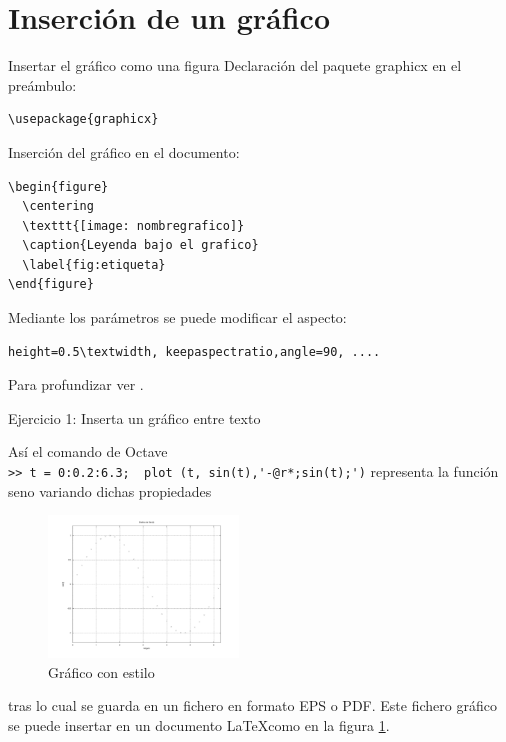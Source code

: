 \documentclass{beamer}
\begin{document}
\section{Inserci\'on de un gr\'afico}
\begin{frame}[fragile]{Insertar el gr\'afico como una figura}
Declaraci\'on del paquete graphicx en el pre\'ambulo:
\begin{verbatim}\usepackage{graphicx} \end{verbatim}

Inserci\'on del gr\'afico en el documento:
\begin{verbatim}
\begin{figure}
  \centering
  \texttt{[image: nombregrafico]}
  \caption{Leyenda bajo el grafico}
  \label{fig:etiqueta}
\end{figure}
\end{verbatim}
Mediante los par\'ametros se puede modificar el aspecto:\\
\begin{verbatim}height=0.5\textwidth, keepaspectratio,angle=90, ....\end{verbatim}
Para profundizar ver \cite{ManualImportingGraphics,ManualLatexWikilibros} .
\end{frame}
\begin{frame}[fragile]
\begin{exampleblock}{Ejercicio 1: Inserta un gr\'afico entre texto}
{\small As\'i el comando de Octave\\
\verb|>> t = 0:0.2:6.3;  plot (t, sin(t),'-@r*;sin(t);')|
representa la funci\'on seno variando dichas propiedades
\begin{figure}
\begin{center}
\includegraphics[width=0.45\textwidth]{graficos/sin.pdf}
\end{center}
\caption{Gr\'afico con estilo \label{figura:sinestilo}}
\end{figure}
tras lo cual se guarda en un fichero  en formato EPS o PDF.
Este fichero gr\'afico se puede insertar en un documento \LaTeX como en la figura \ref{figura:sinestilo}.
}
\end{exampleblock}
\end{frame}
\end{document}
